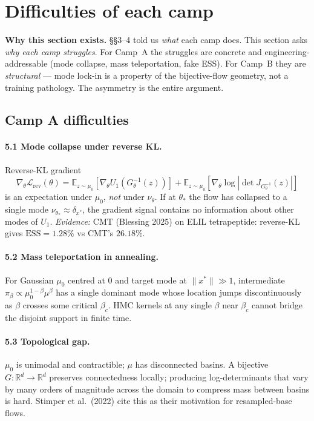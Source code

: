\documentclass[11pt,letterpaper]{article}
\newcommand{\E}{\mathbb{E}}
\newcommand{\Real}{\mathbb{R}}
\newcommand{\ESS}{\mathrm{ESS}}
\theoremstyle{plain}
\begin{document}
\section{Difficulties of each camp}

\begin{callout}
\textbf{Why this section exists.} \S\S3--4 told us \emph{what} each camp does. This
section asks \emph{why each camp struggles}. For Camp~A the struggles are concrete
and engineering-addressable (mode collapse, mass teleportation, fake ESS). For
Camp~B they are \emph{structural} --- mode lock-in is a property of the
bijective-flow geometry, not a training pathology. The asymmetry is the entire
argument.
\end{callout}

\subsection{Camp A difficulties}

\paragraph{5.1 Mode collapse under reverse KL.} Reverse-KL gradient
\[
  \nabla_\theta\mathcal L_{\mathrm{rev}}(\theta) = \E_{z\sim\mu_0}[\nabla_\theta U_1(G^{-1}_\theta(z))] + \E_{z\sim\mu_0}[\nabla_\theta\log|\det J_{G^{-1}_\theta}(z)|]
\]
is an expectation under $\mu_0$, \emph{not} under $\nu_\theta$. If at $\theta_*$
the flow has collapsed to a single mode $\nu_{\theta_*}\approx\delta_{x^*}$, the
gradient signal contains no information about other modes of $U_1$.
\emph{Evidence:} CMT (Blessing 2025) on ELIL tetrapeptide: reverse-KL gives
$\ESS=1.28\%$ vs CMT's $26.18\%$.

\paragraph{5.2 Mass teleportation in annealing.} For Gaussian $\mu_0$ centred at
0 and target mode at $\|x^*\|\gg 1$, intermediate
$\pi_\beta\propto\mu_0^{1-\beta}\mu^\beta$ has a single dominant mode whose
location jumps discontinuously as $\beta$ crosses some critical $\beta_c$.
HMC kernels at any single $\beta$ near $\beta_c$ cannot bridge the disjoint
support in finite time.

\paragraph{5.3 Topological gap.} $\mu_0$ is unimodal and contractible; $\mu$ has
disconnected basins. A bijective $G:\Real^d\to\Real^d$ preserves connectedness
locally; producing log-determinants that vary by many orders of magnitude across
the domain to compress mass between basins is hard. Stimper et al.\ (2022) cite
this as their motivation for resampled-base flows.
\end{document}

